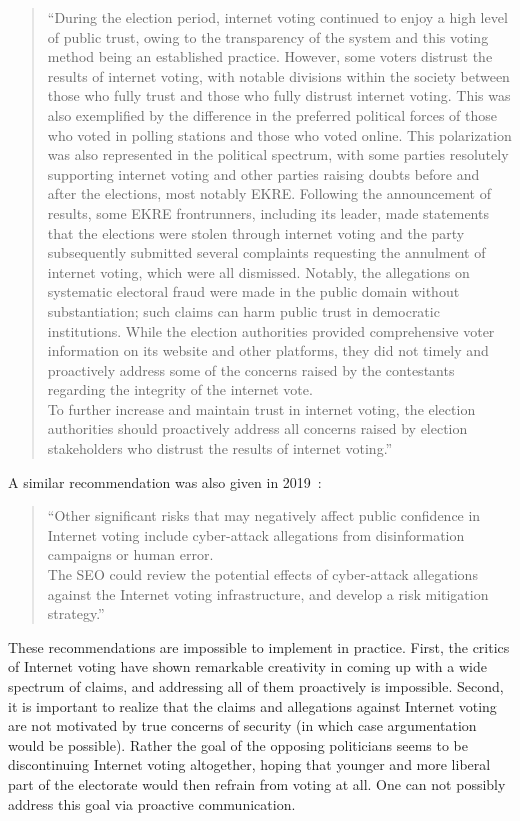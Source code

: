 \documentclass{llncs}
\begin{document}
\begin{quote}
``During the election period, internet voting continued to enjoy a high level of public trust, owing to the transparency of the system and this voting method being an established practice. However, some voters distrust the results of internet voting, with notable divisions within the society between those who fully trust and those who fully distrust internet voting. This was also exemplified by the difference in the preferred political forces of those who voted in polling stations and those who voted online.  This polarization was also represented in the political spectrum, with some parties resolutely supporting internet voting and other parties raising doubts before and after the elections, most notably EKRE. Following the announcement of results, some EKRE frontrunners, including its leader, made statements that the elections were stolen through internet voting and the party subsequently submitted several complaints requesting the annulment of internet voting, which were all dismissed. Notably, the allegations on systematic electoral fraud were made in the public domain without substantiation; such claims can harm public trust in democratic institutions. While the election authorities provided comprehensive voter information on its website and other platforms, they did not timely and proactively address some of the concerns raised by the contestants regarding the integrity of the internet vote.\\[1ex]
To further increase and maintain trust in internet voting, the election authorities should proactively address all concerns raised by election stakeholders who distrust the results of internet voting.''
\end{quote}
A similar recommendation was also given in 2019~\cite{ODIHR2019}:
\begin{quote}
    ``Other significant risks that may negatively affect public confidence in Internet voting include cyber-attack allegations from disinformation campaigns or human error.\\[1ex]
    The SEO could review the potential effects of cyber-attack allegations against the Internet voting infrastructure, and develop a risk mitigation strategy.''
\end{quote}

These recommendations are impossible to implement in practice. First, the critics of Internet voting have shown remarkable creativity in coming up with a wide spectrum of claims, and addressing all of them proactively is impossible. Second, it is important to realize that the claims and allegations against Internet voting are not motivated by true concerns of security (in which case argumentation would be possible). Rather the goal of the opposing politicians seems to be discontinuing Internet voting altogether, hoping that younger and more liberal part of the electorate would then refrain from voting at all. One can not possibly address this goal via proactive communication.
\end{document}
